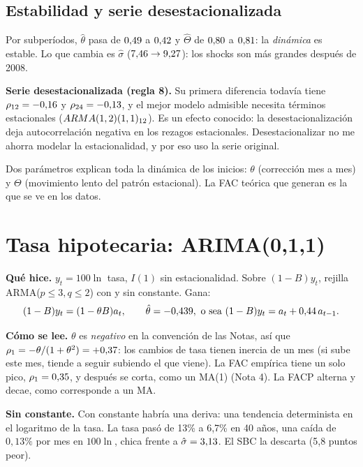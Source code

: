 \documentclass[11pt,a4paper]{article}
\begin{document}
\subsection{Estabilidad y serie desestacionalizada}\label{sec:sa}
Por subper\'iodos, $\hat\theta$ pasa de $0{,}49$ a $0{,}42$ y $\hat\Theta$ de $0{,}80$ a $0{,}81$: la \emph{din\'amica} es estable. Lo que cambia es $\hat\sigma$ ($7{,}46\to9{,}27$): los shocks son m\'as grandes despu\'es de 2008.

\textbf{Serie desestacionalizada (regla 8).} Su primera diferencia todav\'ia tiene $\rho_{12}=-0{,}16$ y $\rho_{24}=-0{,}13$, y el mejor modelo admisible necesita t\'erminos estacionales ($ARMA(1,2)(1,1)_{12}$). Es un efecto conocido: la desestacionalizaci\'on deja autocorrelaci\'on negativa en los rezagos estacionales. Desestacionalizar no me ahorra modelar la estacionalidad, y por eso uso la serie original.

\begin{clave}Dos par\'ametros explican toda la din\'amica de los inicios: $\theta$ (correcci\'on mes a mes) y $\Theta$ (movimiento lento del patr\'on estacional). La FAC te\'orica que generan es la que se ve en los datos.\end{clave}

\section{Tasa hipotecaria: ARIMA(0,1,1)}
\textbf{Qu\'e hice.} $y_t=100\ln$ tasa, $I(1)$ sin estacionalidad. Sobre $(1-B)y_t$, rejilla ARMA($p\le3,q\le2$) con y sin constante. Gana:
\[
(1-B)y_t=(1-\theta B)a_t,\qquad\hat\theta=\ThetaT,\ \text{o sea}\ (1-B)y_t=a_t+0{,}44\,a_{t-1}.
\]

\textbf{C\'omo se lee.} $\theta$ es \emph{negativo} en la convenci\'on de las Notas, as\'i que $\rho_1=-\theta/(1+\theta^2)=+0{,}37$: los cambios de tasa tienen inercia de un mes (si sube este mes, tiende a seguir subiendo el que viene). La FAC emp\'irica tiene un solo pico, $\rho_1=0{,}35$, y despu\'es se corta, como un MA(1) (Nota 4). La FACP alterna y decae, como corresponde a un MA.

\textbf{Sin constante.} Con constante habr\'ia una deriva: una tendencia determinista en el logaritmo de la tasa. La tasa pas\'o de 13\% a 6,7\% en 40 a\~nos, una ca\'ida de $0{,}13\%$ por mes en $100\ln$, chica frente a $\hat\sigma=3{,}13$. El SBC la descarta (5,8 puntos peor).
\end{document}
